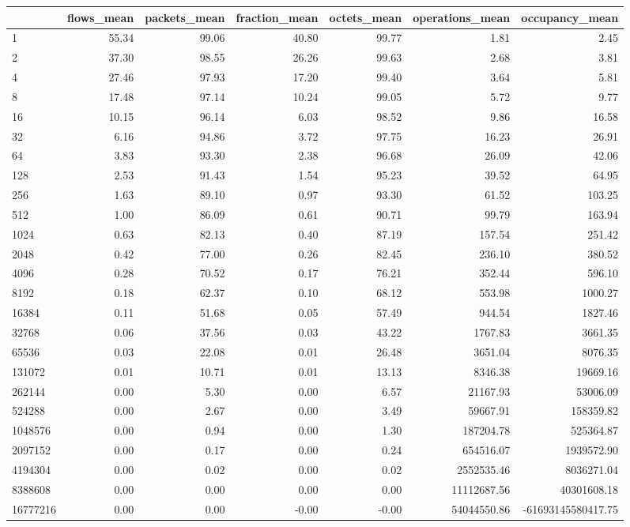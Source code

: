 \begin{tabular}{lrrrrrr}
\toprule
 & flows_mean & packets_mean & fraction_mean & octets_mean & operations_mean & occupancy_mean \\
\midrule
1 & 55.34 & 99.06 & 40.80 & 99.77 & 1.81 & 2.45 \\
2 & 37.30 & 98.55 & 26.26 & 99.63 & 2.68 & 3.81 \\
4 & 27.46 & 97.93 & 17.20 & 99.40 & 3.64 & 5.81 \\
8 & 17.48 & 97.14 & 10.24 & 99.05 & 5.72 & 9.77 \\
16 & 10.15 & 96.14 & 6.03 & 98.52 & 9.86 & 16.58 \\
32 & 6.16 & 94.86 & 3.72 & 97.75 & 16.23 & 26.91 \\
64 & 3.83 & 93.30 & 2.38 & 96.68 & 26.09 & 42.06 \\
128 & 2.53 & 91.43 & 1.54 & 95.23 & 39.52 & 64.95 \\
256 & 1.63 & 89.10 & 0.97 & 93.30 & 61.52 & 103.25 \\
512 & 1.00 & 86.09 & 0.61 & 90.71 & 99.79 & 163.94 \\
1024 & 0.63 & 82.13 & 0.40 & 87.19 & 157.54 & 251.42 \\
2048 & 0.42 & 77.00 & 0.26 & 82.45 & 236.10 & 380.52 \\
4096 & 0.28 & 70.52 & 0.17 & 76.21 & 352.44 & 596.10 \\
8192 & 0.18 & 62.37 & 0.10 & 68.12 & 553.98 & 1000.27 \\
16384 & 0.11 & 51.68 & 0.05 & 57.49 & 944.54 & 1827.46 \\
32768 & 0.06 & 37.56 & 0.03 & 43.22 & 1767.83 & 3661.35 \\
65536 & 0.03 & 22.08 & 0.01 & 26.48 & 3651.04 & 8076.35 \\
131072 & 0.01 & 10.71 & 0.01 & 13.13 & 8346.38 & 19669.16 \\
262144 & 0.00 & 5.30 & 0.00 & 6.57 & 21167.93 & 53006.09 \\
524288 & 0.00 & 2.67 & 0.00 & 3.49 & 59667.91 & 158359.82 \\
1048576 & 0.00 & 0.94 & 0.00 & 1.30 & 187204.78 & 525364.87 \\
2097152 & 0.00 & 0.17 & 0.00 & 0.24 & 654516.07 & 1939572.90 \\
4194304 & 0.00 & 0.02 & 0.00 & 0.02 & 2552535.46 & 8036271.04 \\
8388608 & 0.00 & 0.00 & 0.00 & 0.00 & 11112687.56 & 40301608.18 \\
16777216 & 0.00 & 0.00 & -0.00 & -0.00 & 54044550.86 & -61693145580417.75 \\
\bottomrule
\end{tabular}
